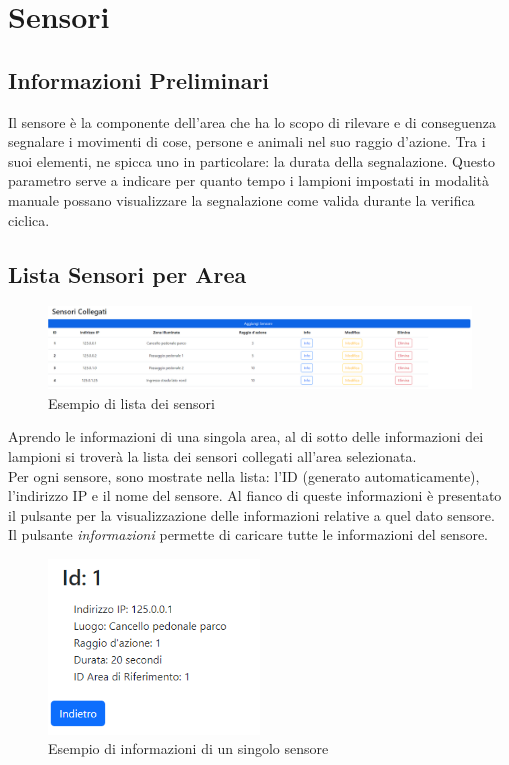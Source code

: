 \documentclass[a4paper, 12pt]{article}
\begin{document}
\newpage
\section{Sensori}
\subsection{Informazioni Preliminari}
Il sensore è la componente dell'area che ha lo scopo di rilevare e di conseguenza segnalare i movimenti di cose, persone e animali nel suo raggio d'azione. Tra i suoi elementi, ne spicca uno in particolare: la durata della segnalazione. Questo parametro serve a indicare per quanto tempo i lampioni impostati in modalità manuale possano visualizzare la segnalazione come valida durante la verifica ciclica.
\subsection{Lista Sensori per Area}
\begin{figure}[H]
    \centering
    \includegraphics[width=\textwidth]{ListaSensori}
    \caption{Esempio di lista dei sensori}
\end{figure}
Aprendo le informazioni di una singola area, al di sotto delle informazioni dei lampioni si troverà la lista dei sensori collegati all'area selezionata.\\
Per ogni sensore, sono mostrate nella lista: l'ID (generato automaticamente), l'indirizzo IP e il nome del sensore. Al fianco di queste informazioni è presentato il pulsante per la visualizzazione delle informazioni relative a quel dato sensore.\\
Il pulsante \textit{informazioni} permette di caricare tutte le informazioni del sensore.\\
\begin{figure}[H]
    \centering
    \includegraphics[width=0.5\textwidth]{InfoSensore}
    \caption{Esempio di informazioni di un singolo sensore}
\end{figure}
\end{document}
